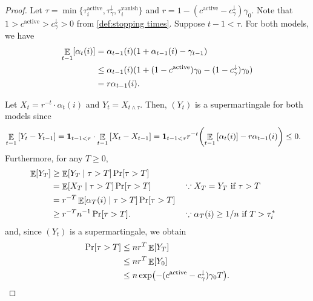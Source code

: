\documentclass[letterpaper,11pt]{article}
\DeclarePairedDelimiter{\rbra}{\lparen}{\rparen} %
\DeclarePairedDelimiter{\sbra}{\lbrack}{\rbrack} %
\newcommand{\indicator}{\mathbf{1}}
\DeclareMathOperator*{\E}{\mathbb{E}}
\newcommand{\alphanorm}{\gamma}
\newcommand{\taunormdown}{\tau^{\downarrow}_\alphanorm}
\newcommand{\taudisappeari}{\tau^*_i}
\newcommand{\cnormdown}{c^{\downarrow}_\alphanorm}
\newcommand{\cactive}{c^{\mathrm{active}}}
\newcommand{\tauivanish}{\tau^{\mathrm{vanish}}_i}
\newcommand{\tauiactive}{\tau^{\mathrm{active}}_i}
\begin{document}
\begin{proof}
Let $ \tau = \min\{\tauiactive,\taunormdown,\tauivanish\} $ and 
  $r = 1 - (\cactive - \cnormdown)\alphanorm_0$.
  Note that $1>\cactive > \cnormdown>0$ from \cref{def:stopping times}.
%
  Suppose $t-1 < \tau$.
  For both models, we have
  \begin{align*} 
    \E_{t-1}\sbra*{ \alpha_t(i) } &= \alpha_{t-1}(i)(1+\alpha_{t-1}(i) - \alphanorm_{t-1}) \\
    &\le \alpha_{t-1}(i)(1+(1-\cactive)\alphanorm_0 - (1-\cnormdown)\alphanorm_0) \\
    &= r\alpha_{t-1}(i).
  \end{align*}

  Let $ X_t = r^{-t}\cdot \alpha_{t}(i) $
  and $ Y_t = X_{t\land \tau}$.
  Then, $(Y_t)$ is a supermartingale for both models since
  \begin{align*} 
     \E_{t-1}\qty[ Y_t - Y_{t-1} ] &=\indicator_{t-1<\tau}\cdot \E_{t-1}\qty[ X_t - X_{t-1} ] =\indicator_{t-1<\tau}r^{-t}\qty(\E_{t-1}\qty[ \alpha_t(i) ] - r\alpha_{t-1}(i)) \le 0.
  \end{align*}
  Furthermore, for any $T\ge 0$,
  \begin{align*}
    \E\sbra*{Y_T}
    &\geq \E\sbra*{Y_T\mid \tau>T}\Pr\sbra*{\tau>T}\\
    &=\E\sbra*{X_T\mid \tau>T}\Pr\sbra*{\tau>T} & & \because\text{$X_T=Y_T$ if $\tau>T$} \\
    &=r^{-T}\E\sbra*{\alpha_T(i)\mid \tau>T}\Pr\sbra*{\tau>T}\\
    &\geq r^{-T}n^{-1}\Pr\sbra*{\tau>T}. & & \because\text{$\alpha_T(i) \ge 1/n$ if $T>\taudisappeari$}
  \end{align*}
  and, since $ (Y_t) $ is a supermartingale, we obtain
  \begin{align}
    \Pr\sbra*{\tau>T}
    &\leq nr^T\E\sbra*{Y_T} \nonumber \\
    &\leq nr^T\E\sbra*{Y_0} \nonumber \\
    &\leq 
      n\exp\rbra*{-(\cactive-\cnormdown)\alphanorm_0T}. \label{eq:weak multi}
    \end{align}
  


\end{proof}
\end{document}
